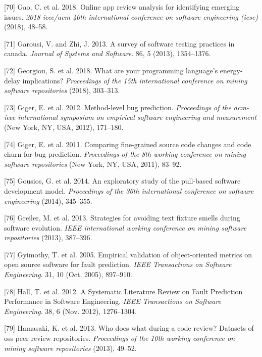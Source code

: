 \documentclass[]{book}
\begin{document}
\hypertarget{ref-gao2018online}{}
{[}70{]} Gao, C. et al. 2018. Online app review analysis for identifying
emerging issues. \emph{2018 ieee/acm 40th international conference on
software engineering (icse)} (2018), 48--58.

\hypertarget{ref-GAROUSI20131354}{}
{[}71{]} Garousi, V. and Zhi, J. 2013. A survey of software testing
practices in canada. \emph{Journal of Systems and Software}. 86, 5
(2013), 1354--1376.

\hypertarget{ref-GKLS2018}{}
{[}72{]} Georgiou, S. et al. 2018. What are your programming language's
energy-delay implications? \emph{Proceedings of the 15th international
conference on mining software repositories} (2018), 303--313.

\hypertarget{ref-giger2012}{}
{[}73{]} Giger, E. et al. 2012. Method-level bug prediction.
\emph{Proceedings of the acm-ieee international symposium on empirical
software engineering and measurement} (New York, NY, USA, 2012),
171--180.

\hypertarget{ref-Giger2011}{}
{[}74{]} Giger, E. et al. 2011. Comparing fine-grained source code
changes and code churn for bug prediction. \emph{Proceedings of the 8th
working conference on mining software repositories} (New York, NY, USA,
2011), 83--92.

\hypertarget{ref-gousios2014exploratory}{}
{[}75{]} Gousios, G. et al. 2014. An exploratory study of the pull-based
software development model. \emph{Proceedings of the 36th international
conference on software engineering} (2014), 345--355.

\hypertarget{ref-greiler2013}{}
{[}76{]} Greiler, M. et al. 2013. Strategies for avoiding text fixture
smells during software evolution. \emph{IEEE international working
conference on mining software repositories} (2013), 387--396.

\hypertarget{ref-Gyimothy2005}{}
{[}77{]} Gyimothy, T. et al. 2005. Empirical validation of
object-oriented metrics on open source software for fault prediction.
\emph{IEEE Transactions on Software Engineering}. 31, 10 (Oct. 2005),
897--910.

\hypertarget{ref-Hall2012}{}
{[}78{]} Hall, T. et al. 2012. A Systematic Literature Review on Fault
Prediction Performance in Software Engineering. \emph{IEEE Transactions
on Software Engineering}. 38, 6 (Nov. 2012), 1276--1304.

\hypertarget{ref-hamasaki2013does}{}
{[}79{]} Hamasaki, K. et al. 2013. Who does what during a code review?
Datasets of oss peer review repositories. \emph{Proceedings of the 10th
working conference on mining software repositories} (2013), 49--52.
\end{document}

